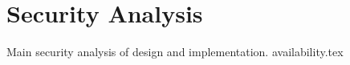 \section{Security Analysis}%
\label{sec:security_analysis}
Main security analysis of design and implementation.
{availability.tex}
